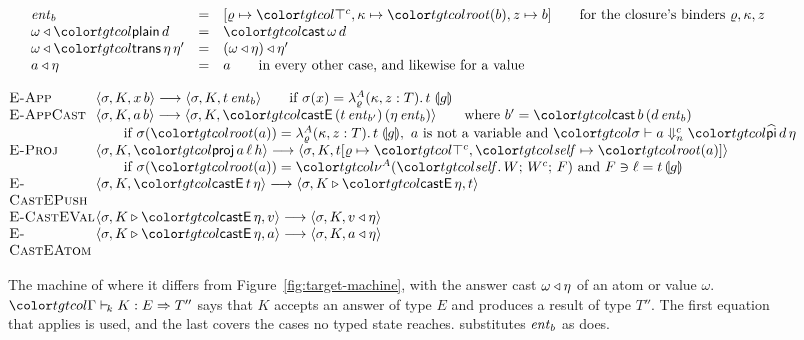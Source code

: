 \begin{figure}[t]
\footnotesize
\color{tgtcol}
\[
\begin{array}{@{}lcl@{}}
\ent{b} & = & [\varrho \mapsto \topc, \kappa \mapsto \rt{b}, z \mapsto b] \qquad \text{for the closure's binders } \varrho, \kappa, z \\
\appE{\omega}{\ev{plain}\,d} & = & \ev{cast}\,\omega\,d \\
\appE{\omega}{\ev{trans}\,\eta\,\eta'} & = & \appE{(\appE{\omega}{\eta})}{\eta'} \\
\appE{a}{\eta} & = & a \qquad \text{in every other case, and likewise for a value}
\end{array}
\]
\[
\begin{array}{@{}p{6.2em}@{}l@{}}
\rn{E-App} & \mst{\sigma}{K}{x\,b} \step \mst{\sigma}{K}{t\,\ent{b}} \qquad \text{if } \sigma(x) = \lamcc{A}{\varrho}{\kappa, z}{T}{t}{g} \\
\rn{E-AppCast} & \mst{\sigma}{K}{a\,b} \step \mst{\sigma}{K}{\ev{castE}\,(t\,\ent{b'})\,(\eta\,\ent{b})} \qquad \text{where } b' = \ev{cast}\,b\,(d\,\ent{b}) \\
 & \qquad \text{if } \sigma(\rt{a}) = \lamcc{A}{\varrho}{\kappa, z}{T}{t}{g},\ a \text{ is not a variable and } \chn{\sigma}{a}{n}{\form{pi}\,d\,\eta} \\
\rn{E-Proj} & \mst{\sigma}{K}{\ev{proj}\,a\,\ell\,h} \step \mst{\sigma}{K}{t[\varrho \mapsto \topc, \self \mapsto \rt{a}]} \\
 & \qquad \text{if } \sigma(\rt{a}) = \litc{A}{W}{W^{c}}{F} \text{ and } F \ni \ell = t\,\ann{g} \\
\rn{E-CastEPush} & \mst{\sigma}{K}{\ev{castE}\,t\,\eta} \step \mst{\sigma}{K \triangleright \ev{castE}\,\eta}{t} \\
\rn{E-CastEVal} & \mst{\sigma}{K \triangleright \ev{castE}\,\eta}{v} \step \mst{\sigma}{K}{\appE{v}{\eta}} \\
\rn{E-CastEAtom} & \mst{\sigma}{K \triangleright \ev{castE}\,\eta}{a} \step \mst{\sigma}{K}{\appE{a}{\eta}}
\end{array}
\]
\color{black}
\caption{The machine of \treeCC where it differs from Figure~\ref{fig:target-machine}, with the answer cast $\omega \mathbin{\triangleleft} \eta$ of an atom or value $\omega$. $\contj{\Gamma}{K}{E}{T''}$ says that $K$ accepts an answer of type $E$ and produces a result of type $T''$. The first equation that applies is used, and the last covers the cases no typed state reaches.  substitutes $\mathit{ent}_{b}$ as  does.}
\label{fig:cc-machine}
\end{figure}

